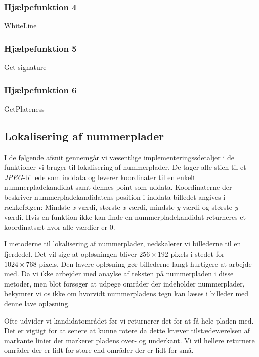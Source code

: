 \subsubsection{Hjælpefunktion 4}
WhiteLine 
\subsubsection{Hjælpefunktion 5}
\label{sec:imp:GetSignature}
Get signature
\subsubsection{Hjælpefunktion 6}
\label{sec:imp:GetPlateness}
GetPlateness

\subsection{Lokalisering af nummerplader}
I de følgende afsnit gennemgår vi væsentlige implementeringssdetaljer i de funktioner vi bruger til lokalisering af nummerplader. De tager alle stien til et \textit{JPEG}-billede som inddata og leverer koordinater til en enkelt nummerpladekandidat samt dennes point som uddata. Koordinaterne der beskriver nummerpladekandidatens position i inddata-billedet angives i rækkefølgen: Mindste \textit{x}-værdi, største \textit{x}-værdi, mindste \textit{y}-værdi og største \textit{y}-værdi. Hvis en funktion ikke kan finde en nummerpladekandidat returneres et koordinatsæt hvor alle værdier er $0$.

I metoderne til lokalisering af nummerplader, nedskalerer vi billederne til en fjerdedel. Det vil sige at opløsningen bliver $256 \times 192$ pixels i stedet for $1024 \times 768$ pixels. Den lavere opløsning gør billederne langt hurtigere at arbejde med. Da vi ikke arbejder med anaylse af teksten på nummerpladen i disse metoder, men blot forsøger at udpege områder der indeholder nummerplader, bekymrer vi os ikke om hvorvidt nummerpladens tegn kan læses i billeder med denne lave opløsning.


Ofte udvider vi kandidatområdet før vi returnerer det for at få hele pladen med. Det er vigtigt for at senere at kunne rotere da dette kræver tilstædeværelsen af markante linier der markerer pladens over- og underkant. Vi vil hellere returnere områder der er lidt for store end områder der er lidt for små.%

